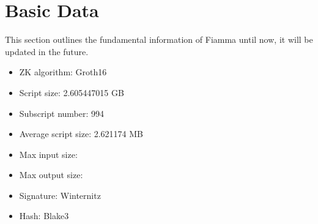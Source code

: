 \section{Basic Data} \label{sec:basic data}
This section outlines the fundamental information of Fiamma until now, it will be updated in the future.

\begin{itemize}
\item ZK algorithm: Groth16 \cite{website:Groth16}
\item Script size: 2.605447015 GB
\item Subscript number: 994
\item Average script size: 2.621174 MB
\item Max input size: 
\item Max output size:
\item Signature: Winternitz
\item Hash: Blake3
\end{itemize}
